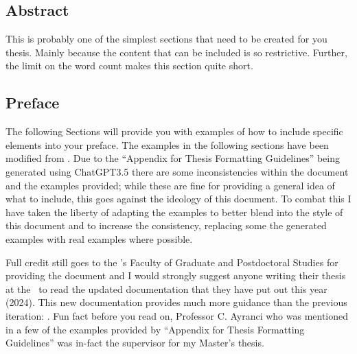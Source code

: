 		\subsection{Abstract}\label{abstract}
			This is probably one of the simplest sections that need to be created for you thesis.
			Mainly because the content that can be included is so restrictive.
			Further, the limit on the word count makes this section quite short.
			

		\subsection{Preface}\label{preface}
			The following Sections will provide you with examples of how to include specific elements into your preface.
			The examples in the following sections have been modified from .
			Due to the ``Appendix for Thesis Formatting Guidelines'' being generated using ChatGPT3.5 there are some inconsistencies within the document and the examples provided; while these are fine for providing a general idea of what to include, this goes against the ideology of this document.
			To combat this I have taken the liberty of adapting the examples to better blend into the style of this document and to increase the consistency, replacing some the generated examples with real examples where possible.
			
			Full credit still goes to the \UofA's Faculty of Graduate and Postdoctoral Studies for providing the document and I would strongly suggest anyone writing their thesis at the \UofA\ to read the updated documentation that they have put out this year (2024).
			This new documentation provides much more guidance than the previous iteration: .
			Fun fact before you read on, Professor C. Ayranci who was mentioned in a few of the examples provided by ``Appendix for Thesis Formatting Guidelines'' was in-fact the supervisor for my Master's thesis.
			

